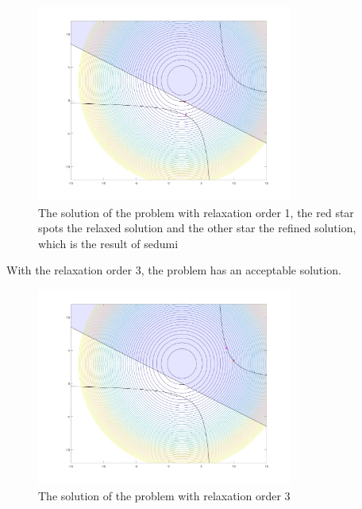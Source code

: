 \begin{figure}[htbp]  %
    \centering
    \includegraphics[width=0.75\textwidth]{images/relaxed1.jpg}
    \caption{The solution of the problem with relaxation order 1, the red star spots the relaxed solution and the other star the refined solution, which is the result of sedumi}
    \label{fig:constraints}
\end{figure}

With the relaxation order 3, the problem has an acceptable solution.


\begin{figure}[htbp]  %
    \centering
    \includegraphics[width=0.75\textwidth]{images/relax3.jpg}
    \caption{The solution of the problem with relaxation order 3}
    \label{fig:constraints}
\end{figure}
